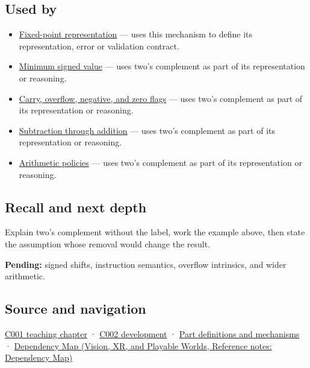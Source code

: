 \subsection{Used by}\label{appendix-4fbc03d20829-used-by}

\hypertarget{appendix-4fbc03d20829-used-by}{}

\begin{itemize}
\item
  \hyperref[appendix-1d0dbe8924cc]{Fixed-point representation} --- uses this mechanism to define its representation, error or validation contract.
\item
  \hyperref[appendix-05f39b10364d]{Minimum signed value} --- uses two's complement as part of its representation or reasoning.
\item
  \hyperref[appendix-8d687c9c08ab]{Carry, overflow, negative, and zero flags} --- uses two's complement as part of its representation or reasoning.
\item
  \hyperref[appendix-1c7df340573e]{Subtraction through addition} --- uses two's complement as part of its representation or reasoning.
\item
  \hyperref[appendix-2ed044358b82]{Arithmetic policies} --- uses two's complement as part of its representation or reasoning.
\end{itemize}

\subsection{Recall and next depth}\label{appendix-4fbc03d20829-recall-and-next-depth}

\hypertarget{appendix-4fbc03d20829-recall-and-next-depth}{}

Explain two's complement without the label, work the example above, then state the assumption whose removal would change the result.

\textbf{Pending:} signed shifts, instruction semantics, overflow intrinsics, and wider arithmetic.

\subsection{Source and navigation}\label{appendix-4fbc03d20829-source-and-navigation}

\hypertarget{appendix-4fbc03d20829-source-and-navigation}{}

\hyperref[01-foundations-i-ch001-from-a-signal-to-an-interpretation]{C001 teaching chapter} · \hyperref[01-foundations-i-ch001-arithmetic-becomes-a-policy]{C002 development} · \hyperref[appendix-fd090d982a15]{Part definitions and mechanisms} · \href{../07-Vision-XR-and-Playable-Worlds/main.pdf\#nameddest=appendix-4ad47bdd269a}{Dependency Map (Vision, XR, and Playable Worlds, Reference notes: Dependency Map)}
